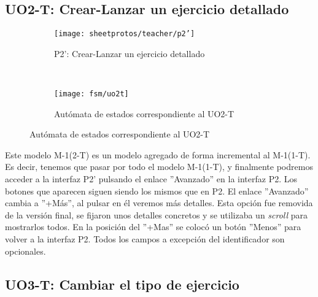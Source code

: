 \subsection{UO2-T: Crear-Lanzar un ejercicio detallado}
\label{analisis-de-requisitos:funcionales:uo2t}

\begin{figure}[H]
\begin{subfigure}[b]{\textwidth}
	\centering
	\texttt{[image: sheetprotos/teacher/p2']}
	\caption{P2': Crear-Lanzar un ejercicio detallado}
	\label{fig:analisis-de-requisitos:funcionales:uo2t:p2'}
\end{subfigure}
\\
\begin{subfigure}[b]{\textwidth}
	\centering
	\texttt{[image: fsm/uo2t]}
	\caption{Autómata de estados correspondiente al UO2-T}
	\label{fig:analisis-de-requisitos:funcionales:uo2t:fsm}
\end{subfigure}
\end{figure}

Este modelo M-1(2-T) es un modelo agregado de forma incremental al M-1(1-T). Es decir, tenemos que pasar por todo el modelo M-1(1-T), y finalmente podremos acceder a la interfaz P2' pulsando el enlace ''Avanzado'' en la interfaz P2. Los botones que aparecen siguen siendo los mismos que en P2. El enlace ''Avanzado'' cambia a ''+Más'', al pulsar en él veremos más detalles. Esta opción fue removida de la versión final, se fijaron unos detalles concretos y se utilizaba un \textit{scroll} para mostrarlos todos. En la posición del ''+Mas'' se colocó un botón ''Menos'' para volver a la interfaz P2. Todos los campos a excepción del identificador son opcionales.\\

\subsection{UO3-T: Cambiar el tipo de ejercicio}
\label{analisis-de-requisitos:funcionales:uo3t}

